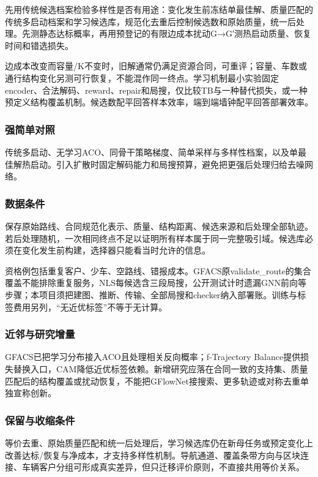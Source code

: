 \documentclass[11pt,a4paper]{article}
\newcommand{\bodytext}[1]{#1\par}
\begin{document}
\bodytext{先用传统候选档案检验多样性是否有用途：变化发生前冻结单最佳解、质量匹配的传统多启动档案和学习候选库，规范化去重后控制候选数和原始质量，统一后处理。先测静态达标概率，再用预登记的有限边成本扰动G→G′测热启动质量、恢复时间和错选损失。}
\bodytext{边成本改变而容量/\allowbreak{}K不变时，旧解通常仍满足资源合同，可重评；容量、车数或通行结构变化另测可行恢复，不能混作同一终点。学习机制最小实验固定encoder、合法解码、reward、repair和局搜，仅比较TB与一种替代损失，或一种预定义结构覆盖机制。候选数配平回答样本效率，端到端墙钟配平回答部署效率。}
\subsubsection{强简单对照}
\bodytext{传统多启动、无学习ACO、同骨干策略梯度、简单采样与多样性档案，以及单最佳解热启动。引入扩散时固定解码能力和局搜预算，避免把更强后处理归给去噪网络。}
\subsubsection{数据条件}
\bodytext{保存原始路线、合同规范化表示、质量、结构距离、候选来源和后处理全部轨迹。若后处理随机，一次相同终点不足以证明所有样本属于同一完整吸引域。候选库必须在变化发生前构建，选择器只能看当时允许的信息。}
\bodytext{资格例包括重复客户、少车、空路线、错报成本。GFACS原validate\_\allowbreak{}route的集合覆盖不能排除重复服务，NLS每候选含三段局搜，公开测试计时遗漏GNN前向等步骤；本项目须把建图、推断、传输、全部局搜和checker纳入部署账。训练与标签费用另列，“无近优标签”不等于无计算。}
\subsubsection{近邻与研究增量}
\bodytext{GFACS已把学习分布接入ACO且处理相关反向概率；f-Trajectory Balance提供损失替换入口，CAM降低近优标签依赖。新增研究应落在合同一致的支持集、质量匹配后的结构覆盖或扰动恢复，不能把GFlowNet接搜索、更多轨迹或对称去重单独宣称创新。}
\subsubsection{保留与收缩条件}
\bodytext{等价去重、原始质量匹配和统一后处理后，学习候选库仍在新母任务或预定变化上改善达标/\allowbreak{}恢复与净成本，才支持多样性机制。导航通道、覆盖条带方向与区块连接、车辆客户分组可形成真实差异，但只迁移评价原则，不直接共用等价关系。}
\end{document}
